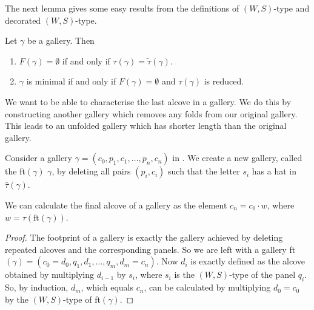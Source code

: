 \documentclass[11pt]{article}
\begin{document}
The next lemma gives some easy results from the definitions of $(W,S)$-type and decorated $(W,S)$-type. 

\begin{lemma}\cite[p.128]{SHA}
    Let $\gamma$ be a gallery. Then
    \begin{enumerate}
        \item $F(\gamma)=\emptyset$ if and only if $\tau(\gamma)=\tilde{\tau}(\gamma).$
        \item $\gamma$ is minimal if and only if $F(\gamma)=\emptyset$ and $\tau(\gamma)$ is reduced.
    \end{enumerate}
\end{lemma}

We want to be able to characterise the last alcove in a gallery. We do this by constructing another gallery which removes any folds from our original gallery. This leads to an unfolded gallery which has shorter length than the original gallery.

\begin{definition}
    Consider a gallery $\gamma = (c_0,p_1,c_1,\hdots ,p_n,c_n)$ in \sg. We create a new gallery, called the  ft$(\gamma)$  $\gamma$, by deleting all pairs $(p_i,c_i)$ such that the letter $s_i$ has a hat in $\hat{\tau}(\gamma)$. 

\end{definition}

\begin{lemma}
    We can calculate the final alcove of a gallery as the element $c_n=c_0\cdot w$, where $w=\tau(\text{ft}(\gamma))$.
\end{lemma}

\begin{proof}
    The footprint of a gallery is exactly the gallery achieved by deleting repeated alcoves and the corresponding panels. So we are left with a gallery ft$(\gamma)=(c_0=d_0,q_1,d_1,\hdots ,q_m,d_m=c_n)$. Now $d_i$ is exactly defined as the alcove obtained by multiplying $d_{i-1}$ by $s_i$, where $s_i$ is the $(W,S)$-type of the panel $q_i$. So, by induction, $d_m$, which equals $c_n$, can be calculated by multiplying $d_0=c_0$ by the $(W,S)$-type of ft$(\gamma)$. 
\end{proof}
\end{document}
